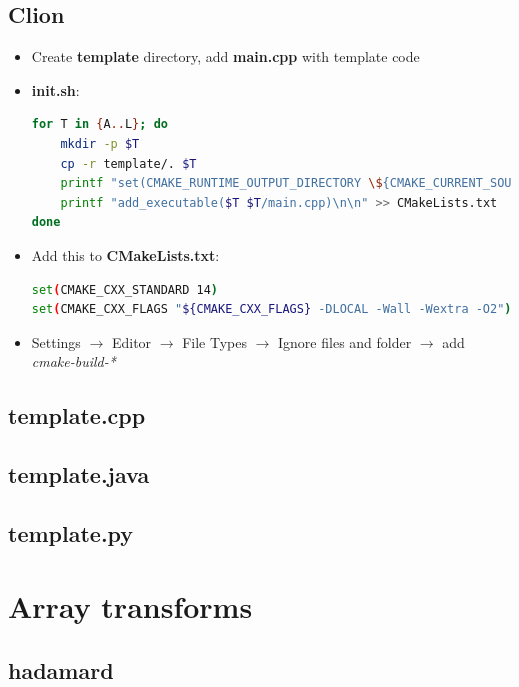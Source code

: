 \subsection{Clion}
\begin{itemize}

    \item Create \textbf{template} directory, add \textbf{main.cpp} with template code

    \item \textbf{init.sh}:
\begin{lstlisting}[language=bash]
for T in {A..L}; do
    mkdir -p $T
    cp -r template/. $T
    printf "set(CMAKE_RUNTIME_OUTPUT_DIRECTORY \${CMAKE_CURRENT_SOURCE_DIR}/$T)\n" >> CMakeLists.txt
    printf "add_executable($T $T/main.cpp)\n\n" >> CMakeLists.txt
done
\end{lstlisting}

\item Add this to \textbf{CMakeLists.txt}:
\begin{lstlisting}[language=bash]
set(CMAKE_CXX_STANDARD 14)
set(CMAKE_CXX_FLAGS "${CMAKE_CXX_FLAGS} -DLOCAL -Wall -Wextra -O2")
\end{lstlisting}

\item Settings $\to$ Editor $\to$ File Types $\to$ Ignore files and folder $\to$ add \textit{cmake-build-*}

\end{itemize}
\subsection{template.cpp}
\raggedbottom
\hrulefill
\subsection{template.java}
\raggedbottom
\hrulefill
\subsection{template.py}
\raggedbottom
\hrulefill

\section{Array transforms}
\subsection{hadamard}
\raggedbottom
\hrulefill
